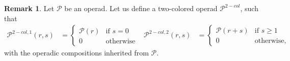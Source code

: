 \documentclass[a4paper]{amsart}
\theoremstyle{plain}
\theoremstyle{definition}
\newtheorem{rem}{Remark}
\newcommand{\Gra}{{\mathsf{Gra}}}
\newcommand{\hGra}{{\mathsf{hGra}}}
\newcommand{\op}{\mathcal}
\newcommand{\FM}{\mathsf{FM}}
\begin{document}

\begin{rem}\label{rem:twocolopfromop}
Let $\op P$ be an operad. Let us define a two-colored operad $\op P^{2-col}$, such that 
\begin{align*}
 \op P^{2-col,1}(r,s) &=
\begin{cases}
 \op P(r) & \text{if $s=0$} \\
0& \text{otherwise}
\end{cases}
&
 \op P^{2-col,2}(r,s) &=
\begin{cases}
 \op P(r+s) & \text{if $s\geq 1$} \\
0& \text{otherwise},
\end{cases}
\end{align*}
with the operadic compositions inherited from $\op P$.
\end{rem}




\newcommand{\stGra}{{}^*\Gra}


\newcommand{\sthGra}{\widehat{\stGra}}

\newcommand{\hZ}{\hat Z}
\end{document}
